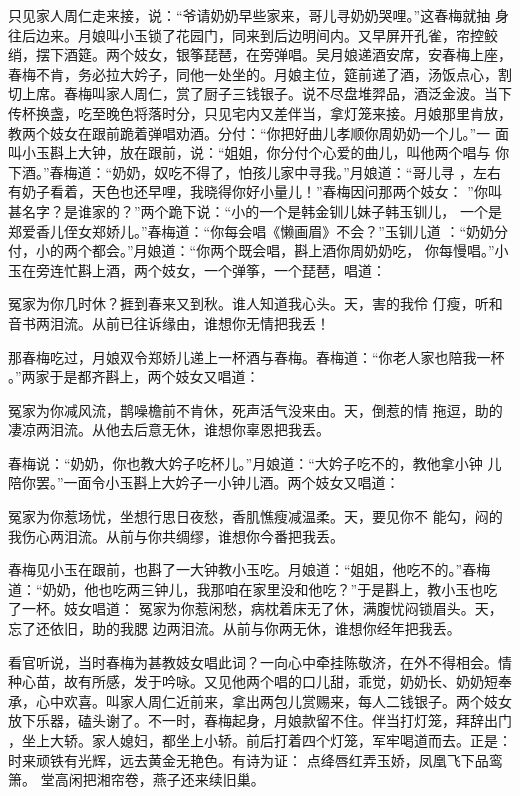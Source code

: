 只见家人周仁走来接，说：“爷请奶奶早些家来，哥儿寻奶奶哭哩。”这春梅就抽
身往后边来。月娘叫小玉锁了花园门，同来到后边明间内。又早屏开孔雀，帘控鲛
绡，摆下酒筵。两个妓女，银筝琵琶，在旁弹唱。吴月娘递酒安席，安春梅上座，
春梅不肯，务必拉大妗子，同他一处坐的。月娘主位，筵前递了酒，汤饭点心，割
切上席。春梅叫家人周仁，赏了厨子三钱银子。说不尽盘堆羿品，酒泛金波。当下
传杯换盏，吃至晚色将落时分，只见宅内又差伴当，拿灯笼来接。月娘那里肯放，
教两个妓女在跟前跪着弹唱劝酒。分付：“你把好曲儿孝顺你周奶奶一个儿。”一
面叫小玉斟上大钟，放在跟前，说：“姐姐，你分付个心爱的曲儿，叫他两个唱与
你下酒。”春梅道：“奶奶，奴吃不得了，怕孩儿家中寻我。”月娘道：“哥儿寻
，左右有奶子看着，天色也还早哩，我晓得你好小量儿！”春梅因问那两个妓女：
”你叫甚名字？是谁家的？”两个跪下说：“小的一个是韩金钏儿妹子韩玉钏儿，
一个是郑爱香儿侄女郑娇儿。”春梅道：“你每会唱《懒画眉》不会？”玉钏儿道
：“奶奶分付，小的两个都会。”月娘道：“你两个既会唱，斟上酒你周奶奶吃，
你每慢唱。”小玉在旁连忙斟上酒，两个妓女，一个弹筝，一个琵琶，唱道：

冤家为你几时休？捱到春来又到秋。谁人知道我心头。天，害的我伶
仃瘦，听和音书两泪流。从前已往诉缘由，谁想你无情把我丢！

那春梅吃过，月娘双令郑娇儿递上一杯酒与春梅。春梅道：“你老人家也陪我一杯
。”两家于是都齐斟上，两个妓女又唱道：

冤家为你减风流，鹊噪檐前不肯休，死声活气没来由。天，倒惹的情
拖逗，助的凄凉两泪流。从他去后意无休，谁想你辜恩把我丢。

春梅说：“奶奶，你也教大妗子吃杯儿。”月娘道：“大妗子吃不的，教他拿小钟
儿陪你罢。”一面令小玉斟上大妗子一小钟儿酒。两个妓女又唱道：

冤家为你惹场忧，坐想行思日夜愁，香肌憔瘦减温柔。天，要见你不
能勾，闷的我伤心两泪流。从前与你共绸缪，谁想你今番把我丢。

春梅见小玉在跟前，也斟了一大钟教小玉吃。月娘道：“姐姐，他吃不的。”春梅
道：“奶奶，他也吃两三钟儿，我那咱在家里没和他吃？”于是斟上，教小玉也吃
了一杯。妓女唱道：
冤家为你惹闲愁，病枕着床无了休，满腹忧闷锁眉头。天，忘了还依旧，助的我腮
边两泪流。从前与你两无休，谁想你经年把我丢。

看官听说，当时春梅为甚教妓女唱此词？一向心中牵挂陈敬济，在外不得相会。情
种心苗，故有所感，发于吟咏。又见他两个唱的口儿甜，乖觉，奶奶长、奶奶短奉
承，心中欢喜。叫家人周仁近前来，拿出两包儿赏赐来，每人二钱银子。两个妓女
放下乐器，磕头谢了。不一时，春梅起身，月娘款留不住。伴当打灯笼，拜辞出门
，坐上大轿。家人媳妇，都坐上小轿。前后打着四个灯笼，军牢喝道而去。正是：
时来顽铁有光辉，远去黄金无艳色。有诗为证：
点绛唇红弄玉娇，凤凰飞下品鸾箫。
堂高闲把湘帘卷，燕子还来续旧巢。

